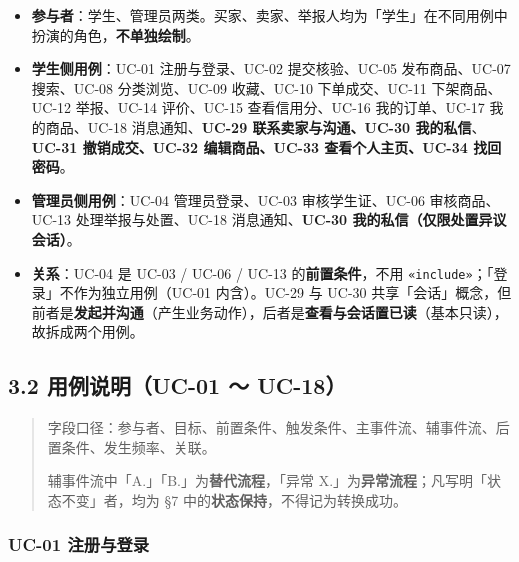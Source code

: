 \documentclass[12pt,a4paper]{ctexart}
\begin{document}
\begin{itemize}[leftmargin=1.6em,itemsep=1pt,topsep=2pt]
\item \textbf{参与者}：学生、管理员两类。买家、卖家、举报人均为「学生」在不同用例中扮演的角色，\textbf{不单独绘制}。
\item \textbf{学生侧用例}：UC-01 注册与登录、UC-02 提交核验、UC-05 发布商品、UC-07 搜索、UC-08 分类浏览、UC-09 收藏、UC-10 下单成交、UC-11 下架商品、UC-12 举报、UC-14 评价、UC-15 查看信用分、UC-16 我的订单、UC-17 我的商品、UC-18 消息通知、\textbf{UC-29 联系卖家与沟通、UC-30 我的私信}、\textbf{UC-31 撤销成交、UC-32 编辑商品、UC-33 查看个人主页、UC-34 找回密码}。
\item \textbf{管理员侧用例}：UC-04 管理员登录、UC-03 审核学生证、UC-06 审核商品、UC-13 处理举报与处置、UC-18 消息通知、\textbf{UC-30 我的私信（仅限处置异议会话）}。
\item \textbf{关系}：UC-04 是 UC-03 / UC-06 / UC-13 的\textbf{前置条件}，不用 \texttt{«include»}；「登录」不作为独立用例（UC-01 内含）。UC-29 与 UC-30 共享「会话」概念，但前者是\textbf{发起并沟通}（产生业务动作），后者是\textbf{查看与会话置已读}（基本只读），故拆成两个用例。
\end{itemize}

\subsection*{3.2 用例说明（UC-01 ～ UC-18）}

\begin{quote}\small
字段口径：参与者、目标、前置条件、触发条件、主事件流、辅事件流、后置条件、发生频率、关联。

辅事件流中「A.」「B.」为\textbf{替代流程}，「异常 X.」为\textbf{异常流程}；凡写明「状态不变」者，均为 §7 中的\textbf{状态保持}，不得记为转换成功。

\end{quote}

\subsubsection*{UC-01 注册与登录}
\end{document}
